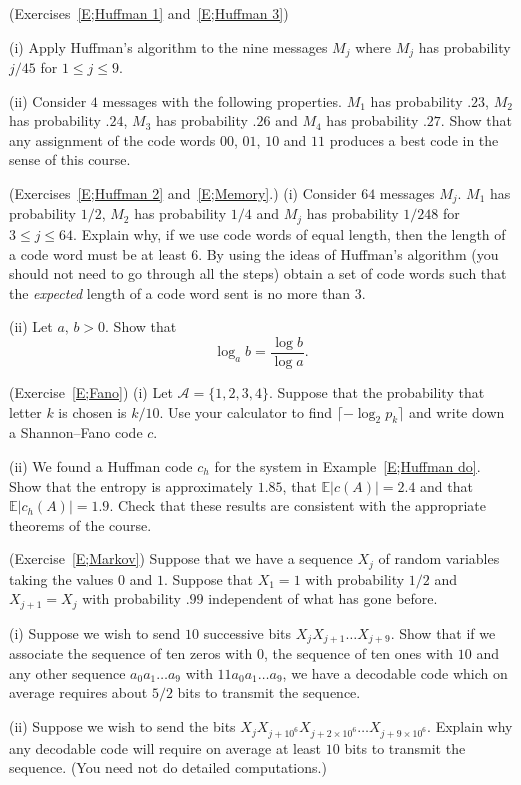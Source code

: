 \begin{question}\label{C1.4}\label{E;Huffman 1 again} 
(Exercises~\ref{E;Huffman 1} and~\ref{E;Huffman 3})

(i) Apply Huffman's algorithm to the nine messages $M_{j}$ where
$M_{j}$ has probability $j/45$
for $1\leq j\leq 9$.

(ii) Consider 
$4$ messages with the following properties. 
$M_{1}$ has probability $.23$,
$M_{2}$ has probability $.24$,
$M_{3}$ has probability $.26$
and $M_{4}$ has probability $.27$. Show that any
assignment of the code words $00$, $01$, $10$
and $11$ produces a best code in the sense of this course.
\end{question}
\begin{question}\label{C1.5} 
(Exercises~\ref{E;Huffman 2} and~\ref{E;Memory}.)
(i) Consider $64$ messages $M_{j}$.
$M_{1}$ has probability $1/2$,
$M_{2}$ has probability $1/4$ and $M_{j}$ has probability
$1/248$ for $3\leq j\leq 64$. 
Explain why, if we use code words of equal length,
then the length of a code word must be at least $6$.
By using the ideas of Huffman's algorithm (you should not
need to go through all the steps) obtain a set of
code words such that the \emph{expected} length of a code word
sent is no more than $3$.

(ii) Let $a,\,b>0$. Show that
\[\log_{a} b=\frac{\log b}{\log a}.\]
\end{question}
\begin{question}\label{C1.6} (Exercise~\ref{E;Fano})
(i) Let ${\mathcal A}=\{1,2,3,4\}$. Suppose that the
probability
that letter $k$ is chosen is $k/10$.
Use your calculator
to find $\lceil -\log_{2} p_{k}\rceil$
and write down a Shannon--Fano
code $c$.

(ii) We found a Huffman code $c_{h}$ for the system
in Example~\ref{E;Huffman do}.
Show
that the entropy is approximately $1.85$,
that ${\mathbb E}|c(A)|=2.4$
and that  ${\mathbb E}|c_{h}(A)|=1.9$.
Check that these results are consistent with
the appropriate theorems of the course.
\end{question}
\begin{question}\label{C1.7} 
(Exercise~\ref{E;Markov})
Suppose that we have a sequence
$X_{j}$ of random variables taking the values
$0$ and $1$. Suppose that $X_{1}=1$ with probability $1/2$
and
$X_{j+1}=X_{j}$ with probability
$.99$ independent of what has gone before.

(i) Suppose we wish to send $10$ successive bits
$X_{j}X_{j+1}\dots X_{j+9}$. Show that if we associate
the sequence of ten zeros with $0$, the sequence
of ten ones with $10$ and any other sequence
$a_{0}a_{1}\dots a_{9}$ with $11a_{0}a_{1}\dots a_{9}$,
we have a decodable code which on average requires
about $5/2$ bits to transmit the sequence.

(ii) Suppose we wish to send the bits
$X_{j}X_{j+10^{6}}X_{j+2\times 10^{6}}\dots X_{j+9\times 10^{6}}$. 
Explain why any decodable code will require
on average at least $10$ bits to transmit the sequence.
(You need not do detailed computations.)
\end{question}

